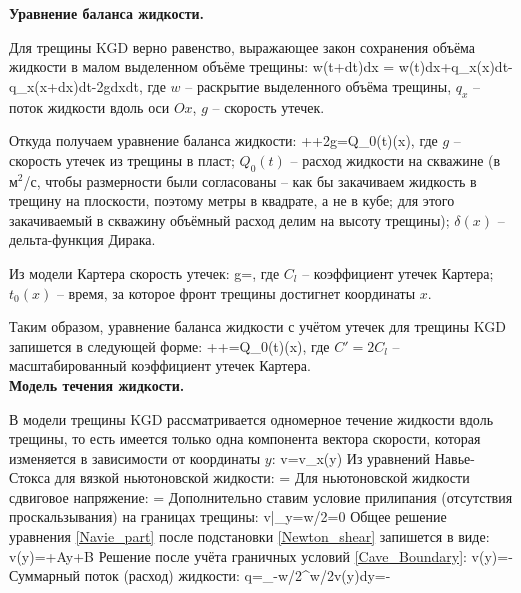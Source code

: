 \textbf{Уравнение баланса жидкости.}

Для трещины KGD верно равенство, выражающее закон сохранения объёма жидкости в малом выделенном объёме трещины:
\beq
w(t+dt)dx = w(t)dx+q_x(x)dt-q_x(x+dx)dt-2gdxdt,
\eeq
где $w$ -- раскрытие выделенного объёма трещины,
$q_x$ -- поток жидкости вдоль оси $Ox$,
$g$ -- скорость утечек.

Откуда получаем уравнение баланса жидкости:
\beq
{}++2g=Q_0(t)\delta(x),
\eeq
где $g$ -- скорость утечек из трещины в пласт;
$Q_0(t)$ -- расход жидкости на скважине (в м$^2$/с, чтобы размерности были согласованы -- как бы закачиваем жидкость в трещину на плоскости, поэтому метры в квадрате, а не в кубе; для этого закачиваемый в скважину объёмный расход делим на высоту трещины);
$\delta(x)$ -- дельта-функция Дирака.

Из модели Картера \cite{karter} скорость утечек:
\beq
g=,
\eeq
где $C_l$ -- коэффициент утечек Картера;
$t_0(x)$ -- время, за которое фронт трещины достигнет координаты $x$.

Таким образом, уравнение баланса жидкости с учётом утечек для трещины KGD запишется в следующей форме:
\beq
{}++=Q_0(t)\delta(x),
\eeq
где $C'=2C_l$ -- масштабированный коэффициент утечек Картера.\\

\textbf{Модель течения жидкости.}

В модели трещины KGD рассматривается одномерное течение жидкости вдоль трещины, то есть имеется только одна компонента вектора скорости, которая изменяется в зависимости от координаты $y$:
\beq
v=v_x(y)
\eeq
Из уравнений Навье-Стокса для вязкой ньютоновской жидкости:
\beq\label{Navie_part}
=
\eeq
Для ньютоновской жидкости сдвиговое напряжение:
\beq\label{Newton_shear}
\tau = \mu{}
\eeq
Дополнительно ставим условие прилипания (отсутствия проскальзывания) на границах трещины:
\beq\label{Cave_Boundary}
v|_{y=\pm w/2}=0
\eeq
Общее решение уравнения \eqref{Navie_part} после подстановки \eqref{Newton_shear} запишется в виде:
\beq
v(y)=+Ay+B
\eeq
Решение после учёта граничных условий \eqref{Cave_Boundary}:
\beq
v(y)=-
\eeq
Суммарный поток (расход) жидкости:
\beq
q=\int\limits_{-w/2}^{w/2}v(y)dy=-
\eeq

